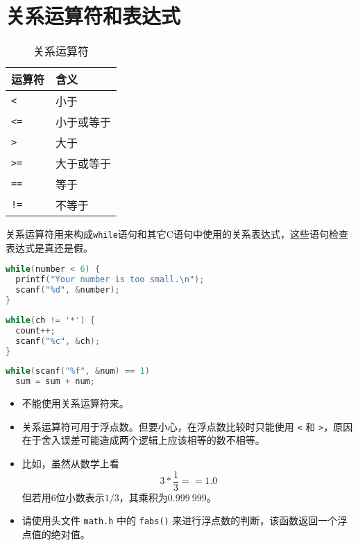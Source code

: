 \section{关系运算符和表达式}

\begin{frame}[fragile]\ft{\secname}
\begin{table}
\centering
\caption{关系运算符}
\begin{tabular}{p{2cm}|p{3cm}}\hline
运算符& 含义\\\hline\hline
\lstinline|<|  & 小于\\[0.1in]
\lstinline|<=| & 小于或等于\\[0.1in]
\lstinline|>|  & 大于\\[0.1in]
\lstinline|>=| & 大于或等于\\[0.1in]
\lstinline|==| & 等于\\[0.1in]
\lstinline|!=| & 不等于\\\hline
\end{tabular}
\end{table}
\end{frame}

\begin{frame}[fragile]\ft{\secname}
关系运算符用来构成\lstinline|while|语句和其它C语句中使用的关系表达式，这些语句检查表达式是真还是假。
\end{frame}

\begin{frame}[fragile]\ft{\secname}
\begin{lstlisting}[language=c]
while(number < 6) {
  printf("Your number is too small.\n");
  scanf("%d", &number);
}
\end{lstlisting} \pause 
\begin{lstlisting}[language=c]
while(ch != '*') {
  count++;
  scanf("%c", &ch);  
}
\end{lstlisting} \pause 

\begin{lstlisting}[language=c]
while(scanf("%f", &num) == 1)
  sum = sum + num;
\end{lstlisting}

\end{frame}

\begin{frame}[fragile]\ft{\secname}
  \begin{itemize}
  \item 不能使用关系运算符来。 \pause 
  \item 关系运算符可用于浮点数。但要小心，在浮点数比较时只能使用 \lstinline|<| 和 \lstinline|>|，原因在于舍入误差可能造成两个逻辑上应该相等的数不相等。
  \item[] 比如，虽然从数学上看
    $$
    3*\frac13==1.0
    $$
    但若用6位小数表示$1/3$，其乘积为$0.999~999$。 \pause 
  \item 请使用头文件 \lstinline|math.h| 中的 \lstinline|fabs()| 来进行浮点数的判断，该函数返回一个浮点值的绝对值。
  \end{itemize}

\end{frame}


